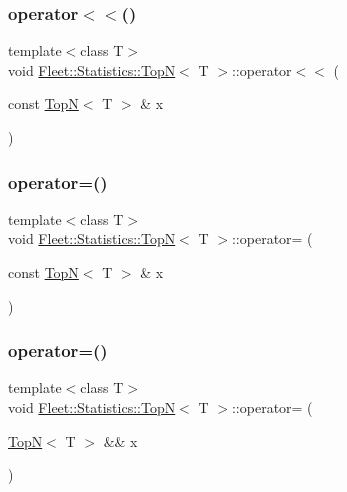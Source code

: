 \subsubsection{\texorpdfstring{operator$<$$<$()}{operator<<()}\hspace{0.1cm}{\footnotesize\ttfamily [2/2]}}
{\footnotesize\ttfamily template$<$class T$>$ \\
void \hyperlink{class_fleet_1_1_statistics_1_1_top_n}{Fleet\+::\+Statistics\+::\+TopN}$<$ T $>$\+::operator$<$$<$ (\begin{DoxyParamCaption}\item[{const \hyperlink{class_fleet_1_1_statistics_1_1_top_n}{TopN}$<$ T $>$ \&}]{x }\end{DoxyParamCaption})\hspace{0.3cm}{\ttfamily [inline]}}

\mbox{\label{class_fleet_1_1_statistics_1_1_top_n_a38d3aba302a215992c603ff2ab13e8fc}} 
\subsubsection{\texorpdfstring{operator=()}{operator=()}\hspace{0.1cm}{\footnotesize\ttfamily [1/2]}}
{\footnotesize\ttfamily template$<$class T$>$ \\
void \hyperlink{class_fleet_1_1_statistics_1_1_top_n}{Fleet\+::\+Statistics\+::\+TopN}$<$ T $>$\+::operator= (\begin{DoxyParamCaption}\item[{const \hyperlink{class_fleet_1_1_statistics_1_1_top_n}{TopN}$<$ T $>$ \&}]{x }\end{DoxyParamCaption})\hspace{0.3cm}{\ttfamily [inline]}}

\mbox{\label{class_fleet_1_1_statistics_1_1_top_n_a6653acde6effd65aa0226cbefc2c8f4f}} 
\subsubsection{\texorpdfstring{operator=()}{operator=()}\hspace{0.1cm}{\footnotesize\ttfamily [2/2]}}
{\footnotesize\ttfamily template$<$class T$>$ \\
void \hyperlink{class_fleet_1_1_statistics_1_1_top_n}{Fleet\+::\+Statistics\+::\+TopN}$<$ T $>$\+::operator= (\begin{DoxyParamCaption}\item[{\hyperlink{class_fleet_1_1_statistics_1_1_top_n}{TopN}$<$ T $>$ \&\&}]{x }\end{DoxyParamCaption})\hspace{0.3cm}{\ttfamily [inline]}}

